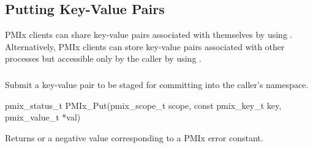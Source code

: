 %
%
%

\subsection{Putting Key-Value Pairs}

\ac{PMIx} clients can share key-value pairs associated with themselves by using .
Alternatively, \ac{PMIx} clients can store key-value pairs associated with other processes but accessible only by the caller by using .


\subsubsection{}

\summary

Submit a key-value pair to be staged for committing into the caller's namespace.

\format

\cspecificstart
\begin{codepar}
pmix_status_t
PMIx_Put(pmix_scope_t scope,
         const pmix_key_t key,
         pmix_value_t *val)
\end{codepar}
\cspecificend

\begin{arglist}
\end{arglist}

Returns  or a negative value corresponding to a PMIx error constant.


